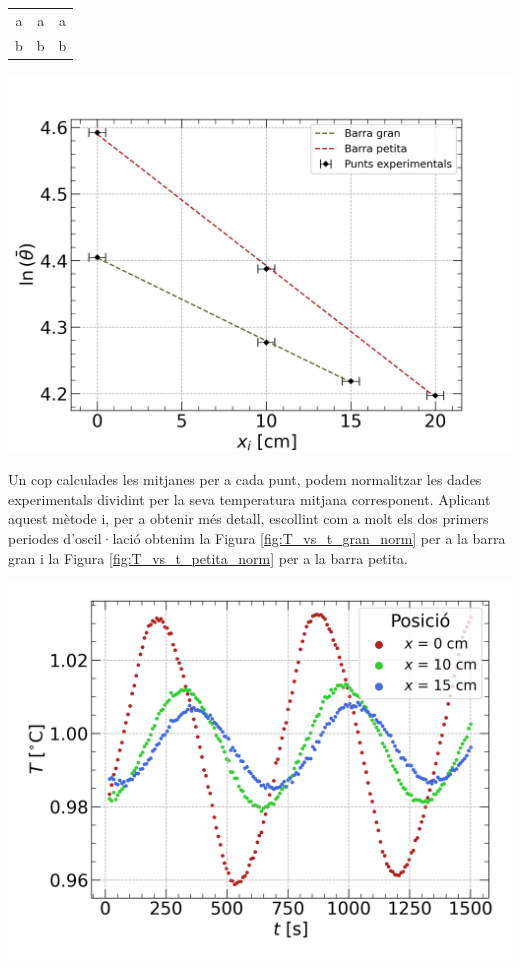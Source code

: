 \documentclass[12pt,twosides,onecolumn,openany]{article}
\newenvironment{Figura}
  {\par\medskip\noindent\minipage{\linewidth}}
  {\endminipage\par\medskip}
\begin{document}
\begin{multicols}{2}
\begin{Figura}
  \centering
  \begin{tabular}{c|c|c}
    a & a & a \\
    b & b & b 
  \end{tabular}
  \label{Tau:pendent_mitjana}
\end{Figura}
\begin{Figura}
  \centering
  \includegraphics[width=1\linewidth]{../../graphs/practica_Ia/plots/linear_reg.png}
  \label{fig:lin_reg}
\end{Figura}
Un cop calculades les mitjanes per a cada punt, podem normalitzar les dades experimentals dividint per la seva temperatura mitjana corresponent. Aplicant aquest mètode i, per a obtenir més detall, escollint com a molt els dos primers periodes d'oscil·lació obtenim la Figura \ref{fig:T_vs_t_gran_norm} per a la barra gran i la Figura \ref{fig:T_vs_t_petita_norm} per a la barra petita.
\begin{Figura}
  \centering
  \includegraphics[width=1\linewidth]{../../graphs/practica_Ia/plots/gran_norm.png}

\end{Figura}
\end{multicols}
\end{document}
